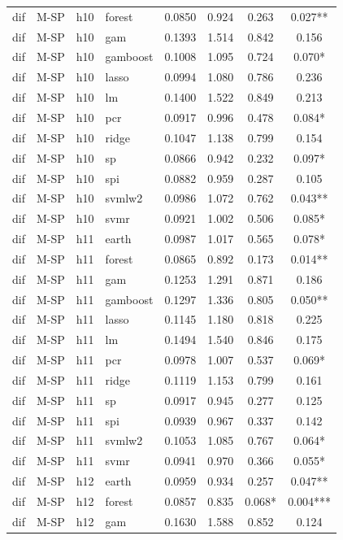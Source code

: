 \begin{ThreePartTable}
\begin{longtable}[t]{llclcccc}
dif & M-SP & h10 & forest & 0.0850 & 0.924 & 0.263 & 0.027**\\
dif & M-SP & h10 & gam & 0.1393 & 1.514 & 0.842 & 0.156\\
dif & M-SP & h10 & gamboost & 0.1008 & 1.095 & 0.724 & 0.070*\\
dif & M-SP & h10 & lasso & 0.0994 & 1.080 & 0.786 & 0.236\\
dif & M-SP & h10 & lm & 0.1400 & 1.522 & 0.849 & 0.213\\
dif & M-SP & h10 & pcr & 0.0917 & 0.996 & 0.478 & 0.084*\\
dif & M-SP & h10 & ridge & 0.1047 & 1.138 & 0.799 & 0.154\\
dif & M-SP & h10 & sp & 0.0866 & 0.942 & 0.232 & 0.097*\\
dif & M-SP & h10 & spi & 0.0882 & 0.959 & 0.287 & 0.105\\
dif & M-SP & h10 & svmlw2 & 0.0986 & 1.072 & 0.762 & 0.043**\\
dif & M-SP & h10 & svmr & 0.0921 & 1.002 & 0.506 & 0.085*\\
\addlinespace
dif & M-SP & h11 & earth & 0.0987 & 1.017 & 0.565 & 0.078*\\
dif & M-SP & h11 & forest & 0.0865 & 0.892 & 0.173 & 0.014**\\
dif & M-SP & h11 & gam & 0.1253 & 1.291 & 0.871 & 0.186\\
dif & M-SP & h11 & gamboost & 0.1297 & 1.336 & 0.805 & 0.050**\\
dif & M-SP & h11 & lasso & 0.1145 & 1.180 & 0.818 & 0.225\\
dif & M-SP & h11 & lm & 0.1494 & 1.540 & 0.846 & 0.175\\
dif & M-SP & h11 & pcr & 0.0978 & 1.007 & 0.537 & 0.069*\\
dif & M-SP & h11 & ridge & 0.1119 & 1.153 & 0.799 & 0.161\\
dif & M-SP & h11 & sp & 0.0917 & 0.945 & 0.277 & 0.125\\
dif & M-SP & h11 & spi & 0.0939 & 0.967 & 0.337 & 0.142\\
dif & M-SP & h11 & svmlw2 & 0.1053 & 1.085 & 0.767 & 0.064*\\
dif & M-SP & h11 & svmr & 0.0941 & 0.970 & 0.366 & 0.055*\\
\addlinespace
dif & M-SP & h12 & earth & 0.0959 & 0.934 & 0.257 & 0.047**\\
dif & M-SP & h12 & forest & 0.0857 & 0.835 & 0.068* & 0.004***\\
dif & M-SP & h12 & gam & 0.1630 & 1.588 & 0.852 & 0.124\\

\end{longtable}
\end{ThreePartTable}

